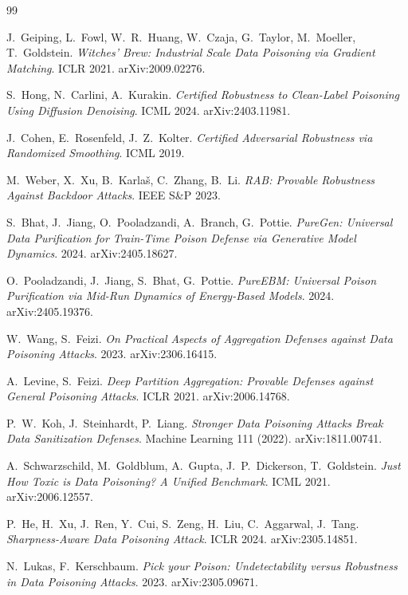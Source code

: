 \documentclass[11pt,a4paper]{article}
\theoremstyle{plain}
\theoremstyle{definition}
\theoremstyle{remark}
\begin{document}
\begin{thebibliography}{99}
\small

 J.~Geiping, L.~Fowl, W.~R.~Huang, W.~Czaja, G.~Taylor, M.~Moeller, T.~Goldstein.
\emph{Witches' Brew: Industrial Scale Data Poisoning via Gradient Matching}. ICLR 2021. arXiv:2009.02276.

 S.~Hong, N.~Carlini, A.~Kurakin.
\emph{Certified Robustness to Clean-Label Poisoning Using Diffusion Denoising}. ICML 2024. arXiv:2403.11981.

 J.~Cohen, E.~Rosenfeld, J.~Z.~Kolter.
\emph{Certified Adversarial Robustness via Randomized Smoothing}. ICML 2019.

 M.~Weber, X.~Xu, B.~Karlaš, C.~Zhang, B.~Li.
\emph{RAB: Provable Robustness Against Backdoor Attacks}. IEEE S\&P 2023.

 S.~Bhat, J.~Jiang, O.~Pooladzandi, A.~Branch, G.~Pottie.
\emph{PureGen: Universal Data Purification for Train-Time Poison Defense via Generative Model Dynamics}. 2024. arXiv:2405.18627.

 O.~Pooladzandi, J.~Jiang, S.~Bhat, G.~Pottie.
\emph{PureEBM: Universal Poison Purification via Mid-Run Dynamics of Energy-Based Models}. 2024. arXiv:2405.19376.

 W.~Wang, S.~Feizi.
\emph{On Practical Aspects of Aggregation Defenses against Data Poisoning Attacks}. 2023. arXiv:2306.16415.

 A.~Levine, S.~Feizi.
\emph{Deep Partition Aggregation: Provable Defenses against General Poisoning Attacks}. ICLR 2021. arXiv:2006.14768.

 P.~W.~Koh, J.~Steinhardt, P.~Liang.
\emph{Stronger Data Poisoning Attacks Break Data Sanitization Defenses}. Machine Learning 111 (2022). arXiv:1811.00741.

 A.~Schwarzschild, M.~Goldblum, A.~Gupta, J.~P.~Dickerson, T.~Goldstein.
\emph{Just How Toxic is Data Poisoning? A Unified Benchmark}. ICML 2021. arXiv:2006.12557.

 P.~He, H.~Xu, J.~Ren, Y.~Cui, S.~Zeng, H.~Liu, C.~Aggarwal, J.~Tang.
\emph{Sharpness-Aware Data Poisoning Attack}. ICLR 2024. arXiv:2305.14851.

 N.~Lukas, F.~Kerschbaum.
\emph{Pick your Poison: Undetectability versus Robustness in Data Poisoning Attacks}. 2023. arXiv:2305.09671.


\end{thebibliography}
\end{document}
